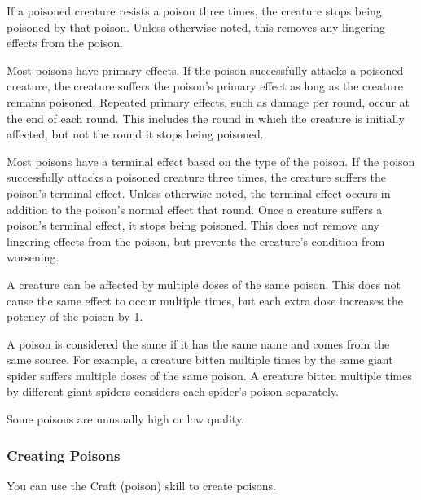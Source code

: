 If a poisoned creature resists a poison three times, the creature stops being poisoned by that poison.
Unless otherwise noted, this removes any lingering effects from the poison.

Most poisons have primary effects.
If the poison successfully attacks a poisoned creature, the creature suffers the poison's primary effect as long as the creature remains poisoned.
Repeated primary effects, such as damage per round, occur at the end of each round.
This includes the round in which the creature is initially affected, but not the round it stops being poisoned.

Most poisons have a terminal effect based on the type of the poison.
If the poison successfully attacks a poisoned creature three times, the creature suffers the poison's terminal effect.
Unless otherwise noted, the terminal effect occurs in addition to the poison's normal effect that round.
Once a creature suffers a poison's terminal effect, it stops being poisoned.
This does not remove any lingering effects from the poison, but prevents the creature's condition from worsening.

A creature can be affected by multiple doses of the same poison.
This does not cause the same effect to occur multiple times, but each extra dose increases the potency of the poison by 1.

A poison is considered the same if it has the same name and comes from the same source.
For example, a creature bitten multiple times by the same giant spider suffers multiple doses of the same poison.
A creature bitten multiple times by different giant spiders considers each spider's poison separately.

 Some poisons are unusually high or low quality.

\subsubsection{Creating Poisons}\label{Creating Poisons}

You can use the Craft (poison) skill to create poisons.
